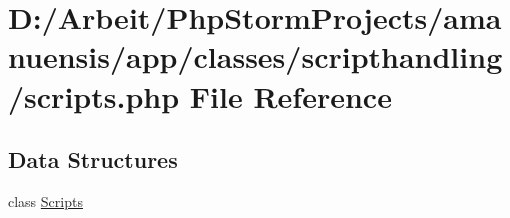 \hypertarget{scripts_8php}{}\section{D\+:/\+Arbeit/\+Php\+Storm\+Projects/amanuensis/app/classes/scripthandling/scripts.php File Reference}
\label{scripts_8php}
\subsection*{Data Structures}
\begin{DoxyCompactItemize}
\item 
class \hyperlink{class_scripts}{Scripts}
\end{DoxyCompactItemize}
